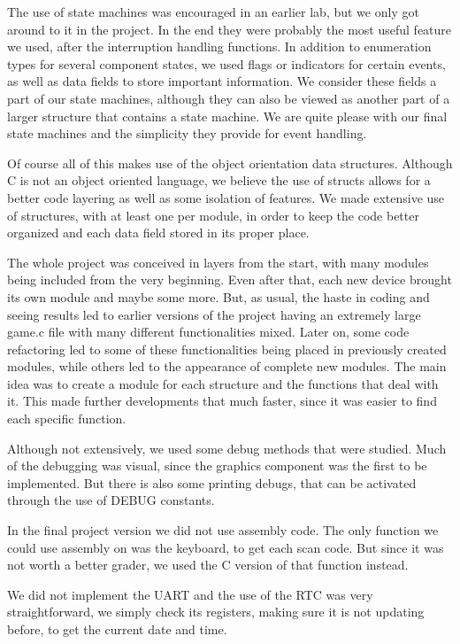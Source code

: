 \documentclass[11pt,a4paper,reqno]{report}
\numberwithin{equation}{section}
\begin{document}
The use of state machines was encouraged in an earlier lab, but we only got around to it in the project. In the end they were probably the most useful feature we used, after the interruption handling functions. In addition to enumeration types for several component states, we used flags or indicators for certain events, as well as data fields to store important information. We consider these fields a part of our state machines, although they can also be viewed as another part of a larger structure that contains a state machine. We are quite please with our final state machines and the simplicity they provide for event handling.

Of course all of this makes use of the object orientation data structures. Although C is not an object oriented language, we believe the use of structs allows for a better code layering as well as some isolation of features. We made extensive use of structures, with at least one per module, in order to keep the code better organized and each data field stored in its proper place.

The whole project was conceived in layers from the start, with many modules being included from the very beginning. Even after that, each new device brought its own module and maybe some more. But, as usual, the haste in coding and seeing results led to earlier versions of the project having an extremely large game.c file with many different functionalities mixed. Later on, some code refactoring led to some of these functionalities being placed in previously created modules, while others led to the appearance of complete new modules. The main idea was to create a module for each structure and the functions that deal with it. This made further developments that much faster, since it was easier to find each specific function. 

Although not extensively, we used some debug methods that were studied. Much of the debugging was visual, since the graphics component was the first to be implemented. But there is also some printing debugs, that can be activated through the use of DEBUG constants.

In the final project version we did not use assembly code. The only function we could use assembly on was the keyboard, to get each scan code. But since it was not worth a better grader, we used the C version of that function instead.

We did not implement the UART and the use of the RTC was very straightforward, we simply check its registers, making sure it is not updating before, to get the current date and time.
\end{document}
